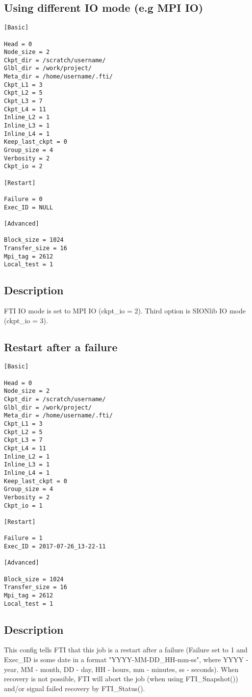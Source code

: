 \documentclass{refrep}
\begin{document}
\subsection{Using different IO mode (e.g MPI IO)}\label{subsec:configmpiio}
\begin{center}
\begin{lstlisting}[frame=single]
[Basic]

Head = 0
Node_size = 2
Ckpt_dir = /scratch/username/
Glbl_dir = /work/project/
Meta_dir = /home/username/.fti/
Ckpt_L1 = 3
Ckpt_L2 = 5
Ckpt_L3 = 7
Ckpt_L4 = 11
Inline_L2 = 1
Inline_L3 = 1
Inline_L4 = 1
Keep_last_ckpt = 0
Group_size = 4
Verbosity = 2
Ckpt_io = 2

[Restart]

Failure = 0
Exec_ID = NULL

[Advanced]

Block_size = 1024
Transfer_size = 16
Mpi_tag = 2612
Local_test = 1

\end{lstlisting}
\end{center}
\subsection*{Description}
FTI IO mode is set to MPI IO (ckpt\_io = 2). Third option is SIONlib IO mode (ckpt\_io = 3).
\newpage
\subsection{Restart after a failure}\label{subsec:configkeeplastckpt}
\begin{center}
\begin{lstlisting}[frame=single]
[Basic]

Head = 0
Node_size = 2
Ckpt_dir = /scratch/username/
Glbl_dir = /work/project/
Meta_dir = /home/username/.fti/
Ckpt_L1 = 3
Ckpt_L2 = 5
Ckpt_L3 = 7
Ckpt_L4 = 11
Inline_L2 = 1
Inline_L3 = 1
Inline_L4 = 1
Keep_last_ckpt = 0
Group_size = 4
Verbosity = 2
Ckpt_io = 1

[Restart]

Failure = 1
Exec_ID = 2017-07-26_13-22-11

[Advanced]

Block_size = 1024
Transfer_size = 16
Mpi_tag = 2612
Local_test = 1

\end{lstlisting}
\end{center}
\subsection*{Description}
This config tells FTI that this job is a restart after a failure (Failure set to 1 and Exec\_ID is some date in a format "YYYY-MM-DD\_HH-mm-ss", where YYYY - year, MM - month, DD - day, HH - hours, mm - minutes, ss - seconds). When recovery is not possible, FTI will abort the job (when using FTI\_Snapshot()) and/or signal failed recovery by FTI\_Status().
\newpage
\end{document}
